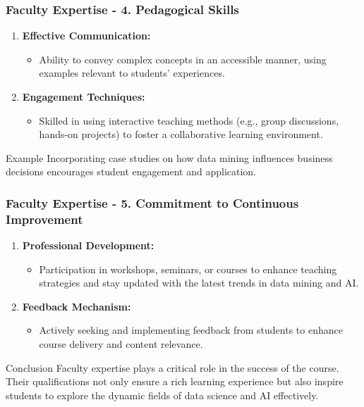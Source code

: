 \documentclass[aspectratio=169]{beamer}
\begin{document}
\begin{frame}[fragile]
    \frametitle{Faculty Expertise - 4. Pedagogical Skills}
    \begin{enumerate}
        \item \textbf{Effective Communication:}
          \begin{itemize}
              \item Ability to convey complex concepts in an accessible manner, using examples relevant to students' experiences.
          \end{itemize}
        \item \textbf{Engagement Techniques:}
          \begin{itemize}
              \item Skilled in using interactive teaching methods (e.g., group discussions, hands-on projects) to foster a collaborative learning environment.
          \end{itemize}
    \end{enumerate}
    \begin{block}{Example}
        Incorporating case studies on how data mining influences business decisions encourages student engagement and application.
    \end{block}
\end{frame}

\begin{frame}[fragile]
    \frametitle{Faculty Expertise - 5. Commitment to Continuous Improvement}
    \begin{enumerate}
        \item \textbf{Professional Development:}
          \begin{itemize}
              \item Participation in workshops, seminars, or courses to enhance teaching strategies and stay updated with the latest trends in data mining and AI.
          \end{itemize}
        \item \textbf{Feedback Mechanism:}
          \begin{itemize}
              \item Actively seeking and implementing feedback from students to enhance course delivery and content relevance.
          \end{itemize}
    \end{enumerate}
    \begin{block}{Conclusion}
        Faculty expertise plays a critical role in the success of the course. Their qualifications not only ensure a rich learning experience but also inspire students to explore the dynamic fields of data science and AI effectively.
    \end{block}
\end{frame}
\end{document}
